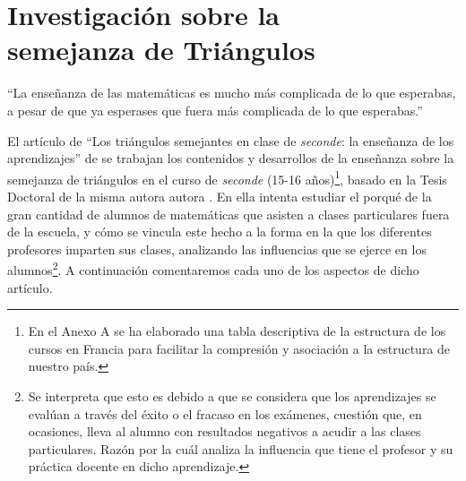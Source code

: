 \chapter[Investigación sobre la semejanza de Triángulos]{Investigación sobre la \\semejanza de Triángulos}

\begin{dedication} 
 ``La enseñanza de las matemáticas es mucho más complicada de lo que esperabas,\\ a pesar de que ya esperases que fuera más complicada de lo que esperabas.''
\end{dedication}
\pagestyle{fancy}

	El artículo de ``Los triángulos semejantes en clase de \textit{seconde}: la enseñanza de los aprendizajes'' de \citet{Horoks} se trabajan los contenidos y desarrollos de la enseñanza sobre la semejanza de triángulos en el curso de \textit{seconde} (15-16 años)\footnote{En el Anexo A se ha elaborado una tabla descriptiva de la estructura de los cursos en Francia para facilitar la compresión y asociación a la estructura de nuestro país.}, basado en la Tesis Doctoral de la misma autora autora \citep{TH}. En ella intenta estudiar el porqué de la gran cantidad de alumnos de matemáticas que asisten a clases particulares fuera de la escuela, y cómo se vincula este hecho a la forma en la que los diferentes profesores imparten sus clases, analizando las influencias que se ejerce en los alumnos\footnote{Se interpreta que esto es debido a que se considera que los aprendizajes se evalúan a través del éxito o el fracaso en los exámenes, cuestión que, en ocasiones, lleva al alumno con resultados negativos a acudir a las clases particulares. Razón por la cuál analiza la influencia que tiene el profesor y su práctica docente en dicho aprendizaje.}. A continuación comentaremos cada uno de los aspectos de dicho artículo. %
	
